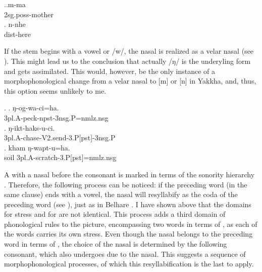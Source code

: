 			
			\ex.\ag.m-ma\\
			{\sc 2sg.poss-}mother\\
			\bg. n-nhe\\
			{\sc dist-}here\\

			
If the stem begins with a vowel or /w/, the nasal is realized as a velar nasal (see \Next). This might lead us to the conclusion that actually /ŋ/ is the underyling form and gets assimilated. This would, however, be the only instance of a morphophonological change from a velar nasal to [m] or [n] in Yakkha, and, thus, this option seems unlikely to me.


\ex. \ag. ŋ-og-wa-ci=ha.\\
			{\sc 3pl.A-}peck{\sc -npst-3nsg.P=nmlz.nsg}\\
	\bg. ŋ-ikt-haks-u-ci.\\
			{\sc 3pl.A-}chase{\sc -V2.send-3.P[pst]-3nsg.P}\\
	\bg. kham ŋ-wapt-u=ha.\\
			soil  {\sc 3pl.A-}scratch{\sc -3.P[pst]=nmlz.nsg}\\


A  with a nasal before the consonant is marked in terms of the sonority hierarchy \citep{Jespersen1904_Lehrbuch, Selkirk1984_SyllableTheory, Hall2000Phonologie}. Therefore, the following  process can be noticed: if the preceding word (in the same clause) ends with a vowel, the nasal will resyllabify as the coda of the preceding word (see \Next), just as in Belhare \citep[547]{Bickel2003Belhare}. I have shown above that the domains for stress and for  are not identical. This process adds a third domain of phonological rules to the picture, encompassing two words in terms of , as each of the words carries its own stress. Even though the nasal belongs to the preceding word in terms of , the choice of the nasal is determined by the following consonant, which also undergoes  due to the nasal. This suggests a sequence of morphophonological processes, of which this resyllabification is the last to apply.    


